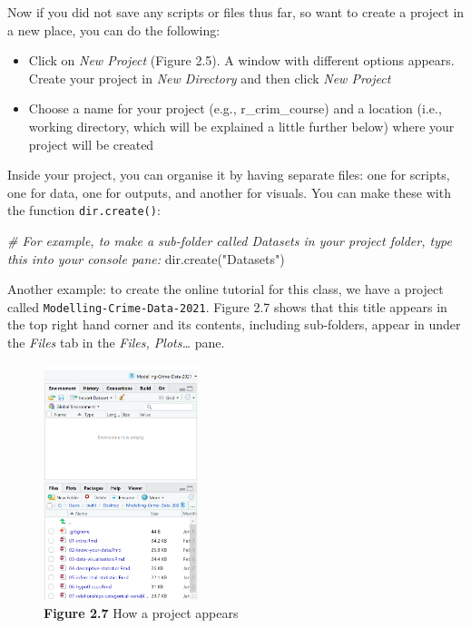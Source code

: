 \documentclass[
]{book}
\newenvironment{Shaded}{\begin{snugshade}}{\end{snugshade}}
\newcommand{\CommentTok}[1]{\textcolor[rgb]{0.56,0.35,0.01}{\textit{#1}}}
\newcommand{\FunctionTok}[1]{\textcolor[rgb]{0.00,0.00,0.00}{#1}}
\newcommand{\NormalTok}[1]{#1}
\newcommand{\StringTok}[1]{\textcolor[rgb]{0.31,0.60,0.02}{#1}}
\begin{document}
Now if you did not save any scripts or files thus far, so want to create a project in a new place, you can do the following:

\begin{itemize}
\item
  Click on \emph{New Project} (Figure 2.5). A window with different options appears. Create your project in \emph{New Directory} and then click \emph{New Project}
\item
  Choose a name for your project (e.g., r\_crim\_course) and a location (i.e., working directory, which will be explained a little further below) where your project will be created
\end{itemize}

Inside your project, you can organise it by having separate files: one for scripts, one for data, one for outputs, and another for visuals. You can make these with the function \texttt{dir.create()}:

\begin{Shaded}
\begin{Highlighting}[]
\CommentTok{\# For example, to make a sub{-}folder called \textquotesingle{}Datasets\textquotesingle{} in your project folder, type this into your console pane:}
\FunctionTok{dir.create}\NormalTok{(}\StringTok{"Datasets"}\NormalTok{)}
\end{Highlighting}
\end{Shaded}

Another example: to create the online tutorial for this class, we have a project called \texttt{Modelling-Crime-Data-2021}. Figure 2.7 shows that this title appears in the top right hand corner and its contents, including sub-folders, appear in under the \emph{Files} tab in the \emph{Files, Plots\ldots{}} pane.

\begin{figure}
\centering
\includegraphics[width=0.4\textwidth,height=\textheight]{Images/project2.png}
\caption{\textbf{Figure 2.7} How a project appears}
\end{figure}
\end{document}
